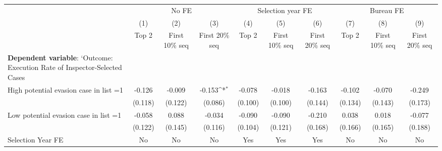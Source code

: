 {
\def\sym#1{\ifmmode^{#1}\else\(^{#1}\)\fi}
\begin{tabular}{l*{9}{c}}
\toprule
            &\multicolumn{3}{c}{No FE}                                        &\multicolumn{3}{c}{Selection year FE}                            &\multicolumn{3}{c}{Bureau FE}                                    \\\cmidrule(lr){2-4}\cmidrule(lr){5-7}\cmidrule(lr){8-10}
            &\multicolumn{1}{c}{(1)}&\multicolumn{1}{c}{(2)}&\multicolumn{1}{c}{(3)}&\multicolumn{1}{c}{(4)}&\multicolumn{1}{c}{(5)}&\multicolumn{1}{c}{(6)}&\multicolumn{1}{c}{(7)}&\multicolumn{1}{c}{(8)}&\multicolumn{1}{c}{(9)}\\
            &\multicolumn{1}{c}{Top 2}&\multicolumn{1}{c}{First 10\% seq}&\multicolumn{1}{c}{First 20\% seq}&\multicolumn{1}{c}{Top 2}&\multicolumn{1}{c}{First 10\% seq}&\multicolumn{1}{c}{First 20\% seq}&\multicolumn{1}{c}{Top 2}&\multicolumn{1}{c}{First 10\% seq}&\multicolumn{1}{c}{First 20\% seq}\\
\midrule
\textbf{Dependent variable}: `Outcome: Execution Rate of Inspector-Selected Cases&                     &                     &                     &                     &                     &                     &                     &                     &                     \\
\addlinespace
High potential evasion case in list =1&      -0.126         &      -0.009         &      -0.153\sym{*}  &      -0.078         &      -0.018         &      -0.163         &      -0.102         &      -0.070         &      -0.249         \\
            &     (0.118)         &     (0.122)         &     (0.086)         &     (0.100)         &     (0.100)         &     (0.144)         &     (0.134)         &     (0.143)         &     (0.173)         \\
\addlinespace
Low potential evasion case in list =1&      -0.058         &       0.088         &      -0.034         &      -0.090         &      -0.090         &      -0.210         &       0.038         &       0.018         &      -0.077         \\
            &     (0.122)         &     (0.145)         &     (0.116)         &     (0.104)         &     (0.121)         &     (0.168)         &     (0.166)         &     (0.165)         &     (0.188)         \\
\midrule
Selection Year FE&          No         &          No         &          No         &         Yes         &         Yes         &         Yes         &          No         &          No         &          No         \\

\end{tabular}}
